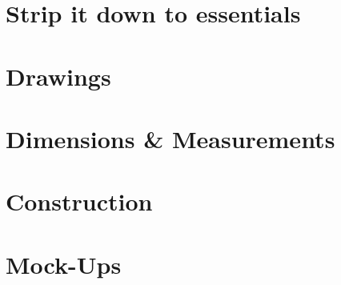 \section{Strip it down to essentials}


\section{Drawings}


\section{Dimensions \& Measurements}


\section{Construction}


\section{Mock-Ups}
